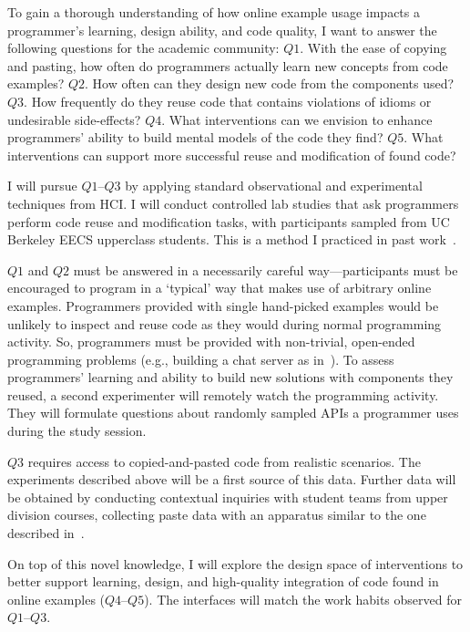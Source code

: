 \documentclass[12pt]{memoir}
\begin{document}
To gain a thorough understanding of how online example usage impacts a programmer's learning, design ability, and code quality, I want to answer the following questions for the academic community:
$Q1$. With the ease of copying and pasting, how often do programmers actually learn new concepts from code examples?
$Q2$. How often can they design new code from the components used?
$Q3$. How frequently do they reuse code that contains violations of idioms or undesirable side-effects?
$Q4$. What interventions can we envision to enhance programmers' ability to build mental models of the code they find?
$Q5$. What interventions can support more successful reuse and modification of found code?


I will pursue $Q1$--$Q3$ by applying standard observational and experimental techniques from HCI\@.
I will conduct controlled lab studies that ask programmers perform code reuse and modification tasks, with participants sampled from UC Berkeley EECS upperclass students.
This is a method I practiced in past work~\cite{head_tutorons_2015}.

$Q1$ and $Q2$ must be answered in a necessarily careful way---participants must be encouraged to program in a `typical' way that makes use of arbitrary online examples.
Programmers provided with single hand-picked examples would be unlikely to inspect and reuse code as they would during normal programming activity.
So, programmers must be provided with non-trivial, open-ended programming problems (e.g., building a chat server as in~\cite{brandt_two_2009}).
To assess programmers' learning and ability to build new solutions with components they reused,
a second experimenter will remotely watch the programming activity.
They will formulate questions about randomly sampled APIs a programmer uses during the study session.

$Q3$ requires access to copied-and-pasted code from realistic scenarios.
The experiments described above will be a first source of this data.
Further data will be obtained by conducting contextual inquiries with student teams from upper division courses, collecting paste data with an apparatus similar to the one described in~\cite{kim_ethnographic_2004}.

On top of this novel knowledge, I will explore the design space of interventions to better support learning, design, and high-quality integration of code found in online examples ($Q4$--$Q5$).
The interfaces will match the work habits observed for $Q1$--$Q3$.
\end{document}
